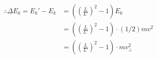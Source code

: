 \begin{equation}
  \begin{aligned}
    \therefore \Delta E_k = E_k' - E_k &= \left(\left(\frac{L}{L'}\right)^2-1\right) E_k \\
                                   &= \left(\left(\frac{L}{L'}\right)^2-1\right) \cdot (1 / 2) mv^2\\
                                   &= \left(\left(\frac{L}{L'}\right)^2-1\right) \cdot mv_\perp^2
  \end{aligned}
\end{equation}




